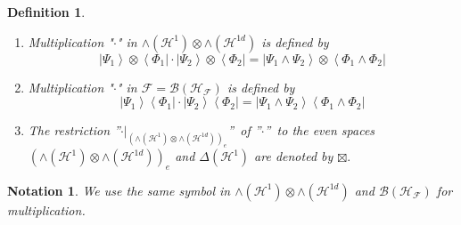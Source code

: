 \documentclass[aps,preprint]{revtex4}%
\newtheorem{definition}[theorem]{Definition}
\newtheorem{notation}[theorem]{Notation}
\begin{document}
\begin{definition}
\begin{enumerate}
\item Multiplication "$\cdot$" in $\wedge\left(  \mathcal{H}^{1}\right)
\otimes\wedge\left(  \mathcal{H}^{1d}\right)  $ is defined by
\begin{equation}
\left\vert \Psi_{1}\right\rangle \otimes\left\langle \Phi_{1}\right\vert
\cdot\left\vert \Psi_{2}\right\rangle \otimes\left\langle \Phi_{2}\right\vert
=\left\vert \Psi_{1}\wedge\Psi_{2}\right\rangle \otimes\left\langle \Phi
_{1}\wedge\Phi_{2}\right\vert
\end{equation}


\item Multiplication "$\cdot$" in $\mathcal{F=B}\left(  \mathcal{H}%
_{\mathcal{F}}\right)  $ is defined by
\begin{equation}
\left\vert \Psi_{1}\right\rangle \left\langle \Phi_{1}\right\vert
\cdot\left\vert \Psi_{2}\right\rangle \left\langle \Phi_{2}\right\vert
=\left\vert \Psi_{1}\wedge\Psi_{2}\right\rangle \left\langle \Phi_{1}%
\wedge\Phi_{2}\right\vert
\end{equation}


\item The restriction \textquotedblright$\left.  \cdot\right\vert _{\left(
\wedge\left(  \mathcal{H}^{1}\right)  \otimes\wedge\left(  \mathcal{H}%
^{1d}\right)  \right)  _{e}}$\textquotedblright\ of \textquotedblright$\cdot
$\textquotedblright\ to the even spaces $\left(  \wedge\left(  \mathcal{H}%
^{1}\right)  \otimes\wedge\left(  \mathcal{H}^{1d}\right)  \right)  _{e}$ and
$\Delta\left(  \mathcal{H}^{1}\right)  $ are denoted by $\boxtimes.$
\end{enumerate}
\end{definition}

\begin{notation}
We use the same symbol in $\wedge\left(  \mathcal{H}^{1}\right)  \otimes
\wedge\left(  \mathcal{H}^{1d}\right)  $ and $\mathcal{B}\left(
\mathcal{H}_{\mathcal{F}}\right)  $ for multiplication.
\end{notation}
\end{document}
